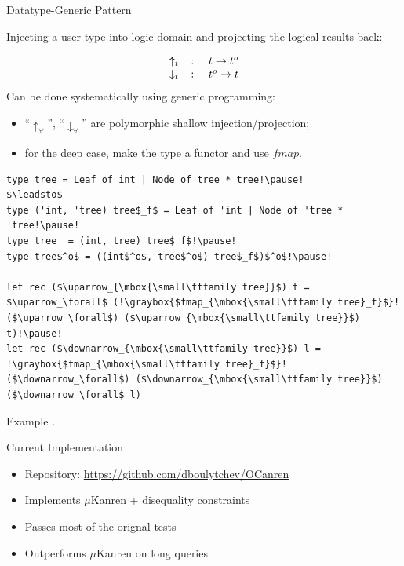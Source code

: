 \documentclass[10pt, mathserif]{beamer}
\let\\\tabularnewline
\let\\\tabularnewline
\newcommand{\oo}[1]{{#1}^o}
\newcommand{\graybox}[1]{\colorbox{light-gray}{#1}}
\theoremstyle{definition}
\begin{document}
\begin{frame}[fragile]{Datatype-Generic Pattern}

\small
Injecting a user-type into logic domain and projecting the
logical results back:

$$
\begin{array}{rcl}
\uparrow_t&\colon &t \to \oo{t}\\
\downarrow_t&\colon& \oo{t} \to t
\end{array}
$$
\pause
Can be done systematically using generic programming:

\begin{itemize}
\item ``$\uparrow_\forall$'', ``$\downarrow_\forall$'' are polymorphic shallow injection/projection;
\item for the deep case, make the type a functor and use $fmap$.
\end{itemize}
\pause
\begin{lstlisting}[mathescape=true]
type tree = Leaf of int | Node of tree * tree!\pause!
$\leadsto$
type ('int, 'tree) tree$_f$ = Leaf of 'int | Node of 'tree * 'tree!\pause!
type tree  = (int, tree) tree$_f$!\pause!
type tree$^o$ = ((int$^o$, tree$^o$) tree$_f$)$^o$!\pause!

let rec ($\uparrow_{\mbox{\small\ttfamily tree}}$) t = $\uparrow_\forall$ (!\graybox{$fmap_{\mbox{\small\ttfamily tree}_f}$}! ($\uparrow_\forall$) ($\uparrow_{\mbox{\small\ttfamily tree}}$) t)!\pause! 
let rec ($\downarrow_{\mbox{\small\ttfamily tree}}$) l = !\graybox{$fmap_{\mbox{\small\ttfamily tree}_f}$}! ($\downarrow_\forall$) ($\downarrow_{\mbox{\small\ttfamily tree}}$) ($\downarrow_\forall$ l) 

\end{lstlisting}
\end{frame}

\begin{frame}[fragile]{Example}
.
\end{frame}

\begin{frame}[fragile]{Current Implementation}
\begin{itemize}
\item Repository: \url{https://github.com/dboulytchev/OCanren}
\item Implements $\mu$Kanren + disequality constraints
\item Passes most of the orignal tests
\item Outperforms $\mu$Kanren on long queries
\end{itemize}

\end{frame}
\end{document}
